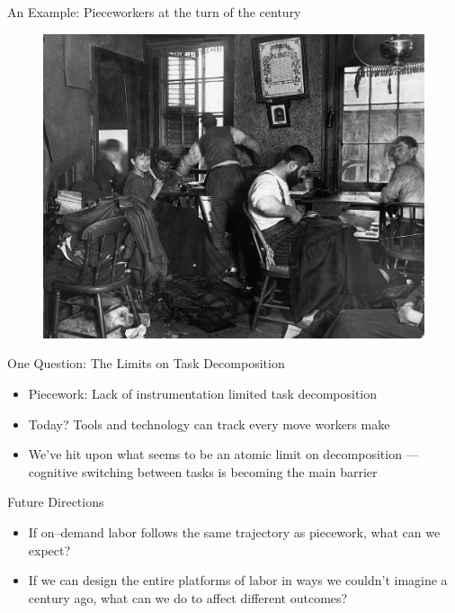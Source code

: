 \documentclass{beamer}
\begin{document}
\begin{frame}{An Example: Pieceworkers at the turn of the  century}
\begin{figure}
    \includegraphics[scale=0.27]{figures/pieceworkers.jpg}  
\end{figure}
\end{frame}


\begin{frame}{One Question: The Limits on Task Decomposition}
  \begin{itemize}[<+- | alert@+>]
  \item Piecework: Lack of instrumentation limited task decomposition
  \item Today? Tools and technology can track every move workers make
  \item We've hit upon what seems to be an atomic limit on decomposition ---
        cognitive switching between tasks is becoming the main barrier
  \end{itemize}
\end{frame}


\begin{frame}{Future Directions}
  \begin{itemize}[<+- | alert@+>]
  \item If on--demand labor follows the same trajectory as piecework, what can we expect?
  \item If we can design the entire platforms of labor in ways we couldn't imagine a century ago, what can we do to affect different outcomes?
  \end{itemize}
\end{frame}
\end{document}
